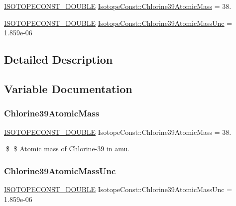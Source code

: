 \begin{DoxyCompactItemize}
\item 
\mbox{\hyperlink{group___isotope_const-_macros_ga8f45a7272ce02c0b4c65c44636ed719a}{I\+S\+O\+T\+O\+P\+E\+C\+O\+N\+S\+T\+\_\+\+D\+O\+U\+B\+LE}} \mbox{\hyperlink{group___isotope_const-_chlorine-_cl39_ga4ade8003e559537150ef6ba395e2059e}{Isotope\+Const\+::\+Chlorine39\+Atomic\+Mass}} = 38.
\item 
\mbox{\hyperlink{group___isotope_const-_macros_ga8f45a7272ce02c0b4c65c44636ed719a}{I\+S\+O\+T\+O\+P\+E\+C\+O\+N\+S\+T\+\_\+\+D\+O\+U\+B\+LE}} \mbox{\hyperlink{group___isotope_const-_chlorine-_cl39_gad4d0a29c1fe295f20c32ede24a3c290a}{Isotope\+Const\+::\+Chlorine39\+Atomic\+Mass\+Unc}} = 1.\+859e-\/06
\end{DoxyCompactItemize}


\subsection{Detailed Description}


\subsection{Variable Documentation}
\mbox{\label{group___isotope_const-_chlorine-_cl39_ga4ade8003e559537150ef6ba395e2059e}} 
\subsubsection{\texorpdfstring{Chlorine39\+Atomic\+Mass}{Chlorine39AtomicMass}}
{\footnotesize\ttfamily \mbox{\hyperlink{group___isotope_const-_macros_ga8f45a7272ce02c0b4c65c44636ed719a}{I\+S\+O\+T\+O\+P\+E\+C\+O\+N\+S\+T\+\_\+\+D\+O\+U\+B\+LE}} Isotope\+Const\+::\+Chlorine39\+Atomic\+Mass = 38.}

\$ \$ Atomic mass of Chlorine-\/39 in amu. \mbox{\label{group___isotope_const-_chlorine-_cl39_gad4d0a29c1fe295f20c32ede24a3c290a}} 
\subsubsection{\texorpdfstring{Chlorine39\+Atomic\+Mass\+Unc}{Chlorine39AtomicMassUnc}}
{\footnotesize\ttfamily \mbox{\hyperlink{group___isotope_const-_macros_ga8f45a7272ce02c0b4c65c44636ed719a}{I\+S\+O\+T\+O\+P\+E\+C\+O\+N\+S\+T\+\_\+\+D\+O\+U\+B\+LE}} Isotope\+Const\+::\+Chlorine39\+Atomic\+Mass\+Unc = 1.\+859e-\/06}

